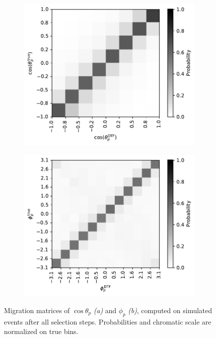 \begin{figure}[t]
	\centering
	\begin{subfigure}{.45\textwidth}
		\includegraphics[width=\textwidth]{graphics/05-angular_distributions/MCRECO_p_theta_migration.pdf}
		\caption{}
		\label{fig:5:MCRECO_p_theta_migration}
	\end{subfigure}
	\begin{subfigure}{.45\textwidth}
		\includegraphics[width=\textwidth]{graphics/05-angular_distributions/MCRECO_p_phi_migration.pdf}
		\caption{}
		\label{fig:5:MCRECO_p_phi_migration}
	\end{subfigure}
	\caption{Migration matrices of $\cos\theta_p$ \textit{(a)} and $\phi_p$ \textit{(b)}, computed on simulated \demonstratorshort events after all selection steps. Probabilities and chromatic scale are normalized on true bins.}
	\label{fig:5:angular_migration_matrices}
\end{figure}

